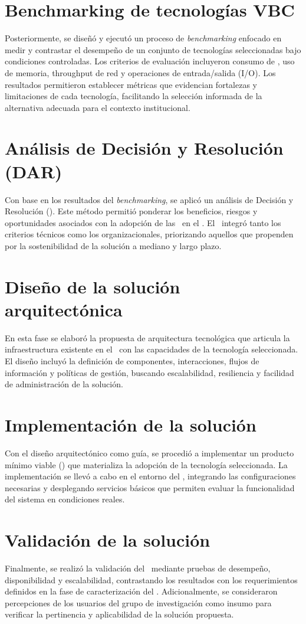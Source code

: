 \section{Benchmarking de tecnologías VBC}
\noindent
Posteriormente, se diseñó y ejecutó un proceso de \textit{benchmarking} enfocado en medir y contrastar el desempeño de un conjunto de tecnologías seleccionadas bajo condiciones controladas. Los criterios de evaluación incluyeron consumo de \CPU, uso de memoria, throughput de red y operaciones de entrada/salida (I/O). Los resultados permitieron establecer métricas que evidencian fortalezas y limitaciones de cada tecnología, facilitando la selección informada de la alternativa adecuada para el contexto institucional.

\section{Análisis de Decisión y Resolución (DAR)}
\noindent
Con base en los resultados del \textit{benchmarking}, se aplicó un análisis de Decisión y Resolución (\DAR). Este método permitió ponderar los beneficios, riesgos y oportunidades asociados con la adopción de las \VBC\ en el \GRID. El \DAR\ integró tanto los criterios técnicos como los organizacionales, priorizando aquellos que propenden por la sostenibilidad de la solución a mediano y largo plazo.

\section{Diseño de la solución arquitectónica}
\noindent
En esta fase se elaboró la propuesta de arquitectura tecnológica que articula la infraestructura existente en el \GRID\ con las capacidades de la tecnología seleccionada. El diseño incluyó la definición de componentes, interacciones, flujos de información y políticas de gestión, buscando escalabilidad, resiliencia y facilidad de administración de la solución.

\section{Implementación de la solución}
\noindent
Con el diseño arquitectónico como guía, se procedió a implementar un producto mínimo viable (\PMV) que materializa la adopción de la tecnología seleccionada. La implementación se llevó a cabo en el entorno del \GRID, integrando las configuraciones necesarias y desplegando servicios básicos que permiten evaluar la funcionalidad del sistema en condiciones reales.

\section{Validación de la solución}
\noindent
Finalmente, se realizó la validación del \PMV\ mediante pruebas de desempeño, disponibilidad y escalabilidad, contrastando los resultados con los requerimientos definidos en la fase de caracterización del \GRID. Adicionalmente, se consideraron percepciones de los usuarios del grupo de investigación como insumo para verificar la pertinencia y aplicabilidad de la solución propuesta.